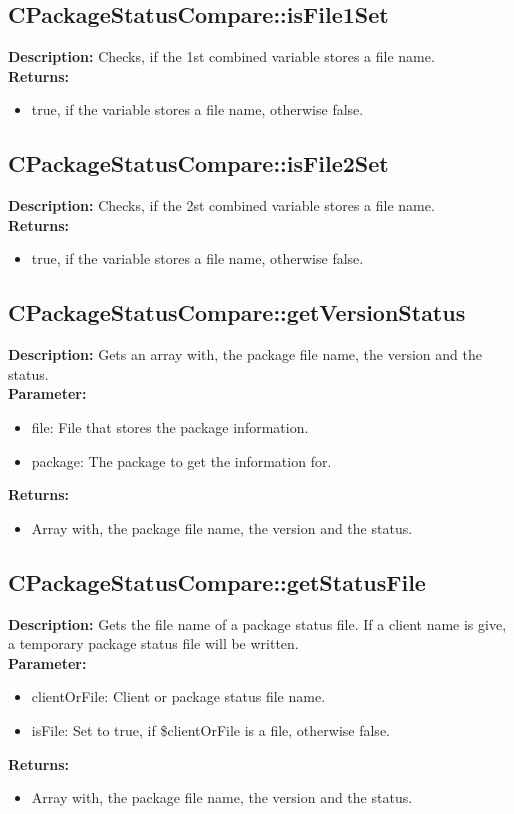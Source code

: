 \subsection{CPackageStatusCompare::isFile1Set}
\textbf{Description:} Checks, if the 1st combined variable stores a file name.\\
\textbf{Returns:}
\begin{itemize}
\item true, if the variable stores a file name, otherwise false.
\end{itemize}

\subsection{CPackageStatusCompare::isFile2Set}
\textbf{Description:} Checks, if the 2st combined variable stores a file name.\\
\textbf{Returns:}
\begin{itemize}
\item true, if the variable stores a file name, otherwise false.
\end{itemize}

\subsection{CPackageStatusCompare::getVersionStatus}
\textbf{Description:} Gets an array with, the package file name, the version and the status.\\
\textbf{Parameter:}
\begin{itemize}
\item file: File that stores the package information.
\item package: The package to get the information for.
\end{itemize}
\textbf{Returns:}
\begin{itemize}
\item Array with, the package file name, the version and the status.
\end{itemize}

\subsection{CPackageStatusCompare::getStatusFile}
\textbf{Description:} Gets the file name of a package status file. If a client name is give, a temporary package status file will be written.\\
\textbf{Parameter:}
\begin{itemize}
\item clientOrFile: Client or package status file name.
\item isFile: Set to true, if \$clientOrFile is a file, otherwise false.
\end{itemize}
\textbf{Returns:}
\begin{itemize}
\item Array with, the package file name, the version and the status.
\end{itemize}

